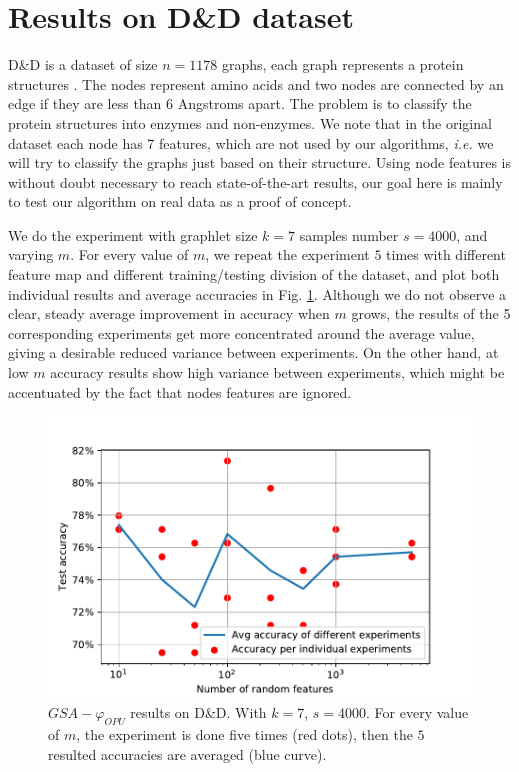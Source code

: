 \section{Results on D\&D dataset}
D\&D is a dataset of size $n=1178$ graphs, each graph represents a protein structures \citep{DD_ref}. The nodes represent amino acids and two nodes are connected by an edge if they are less than 6 Angstroms apart. The problem  is to classify the protein structures into enzymes and non-enzymes. We note that in the original dataset each node has 7 features, which are not used by our algorithms, \emph{i.e.} we will try to classify the graphs just based on their structure. Using node features is without doubt necessary to reach state-of-the-art results, our goal here is mainly to test our algorithm on real data as a proof of concept.

We do the experiment with graphlet size $k=7$ samples number $s=4000$, and varying $m$.
For every value of $m$, we repeat the experiment $5$ times with different feature map and different training/testing division of the dataset, and plot both individual results and average accuracies in Fig. \ref{fig:DD}. %
Although we do not observe a clear, steady average improvement in accuracy when $m$ grows, the results of the 5 corresponding experiments get more concentrated around the average value, giving a desirable reduced variance between experiments. On the other hand, at low $m$ accuracy results show high variance between experiments, which might be accentuated by the fact that nodes features are ignored. %

\begin{figure}[H]
\centering
\includegraphics[scale=0.6]{figs/DD.pdf}
\caption[$GSA-\varphi_{OPU}$ results on D\&D dataset]{$GSA-\varphi_{OPU}$ results on D\&D. With  $k=7$, $s=4000$. For every value of $m$, the experiment is done five times (red dots), then the $5$ resulted accuracies are averaged (blue curve).}
\label{fig:DD}
\end{figure}


